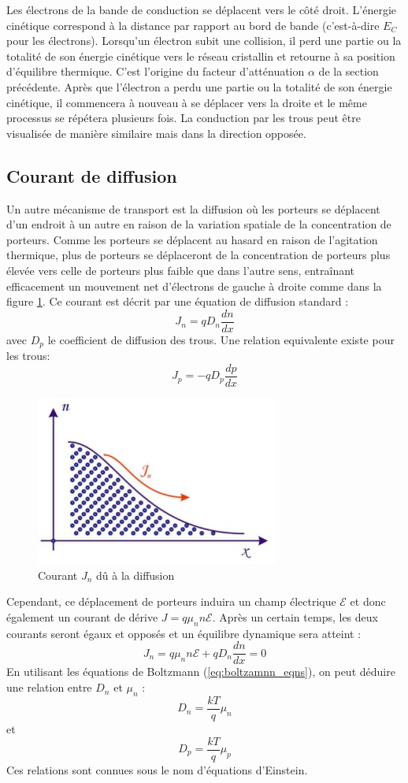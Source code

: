 Les électrons de la bande de conduction se déplacent vers le côté droit. L'énergie cinétique correspond à la distance par rapport au bord de bande (c'est-à-dire $E_C$ pour les électrons). Lorsqu'un électron subit une collision, il perd une partie ou la totalité de son énergie cinétique vers le réseau cristallin et retourne à sa position d'équilibre thermique. C'est l'origine du facteur d'atténuation $\alpha$ de la section précédente. Après que l'électron a perdu une partie ou la totalité de son énergie cinétique, il commencera à nouveau à se déplacer vers la droite et le même processus se répétera plusieurs fois. La conduction par les trous peut être visualisée de manière similaire mais dans la direction opposée.

\subsection{Courant de diffusion}
Un autre mécanisme de transport est la diffusion où les porteurs se déplacent d'un endroit à un autre en raison de la variation spatiale de la concentration de porteurs. Comme les porteurs se déplacent au hasard en raison de l'agitation thermique, plus de porteurs se déplaceront de la concentration de porteurs plus élevée vers celle de porteurs plus faible que dans l'autre sens, entraînant efficacement un mouvement net d'électrons de gauche à droite comme dans la figure \ref{fig:diffusion}. Ce courant est décrit par une équation de diffusion standard :
$$
J_n = q D_n \frac{dn}{dx}
$$
avec $D_p$ le coefficient de diffusion des trous. Une relation equivalente existe pour les trous:
$$
J_p = -q D_p \frac{dp}{dx}
$$
\begin{figure}[h!]
\centering
\includegraphics[width=8cm]{figures/ch01/diffusion.jpg}
\caption{Courant $J_n$ dû à la diffusion} 
\label{fig:diffusion}
\end{figure}
Cependant, ce déplacement de porteurs induira un champ électrique $\mathcal{E}$ et donc également un courant de dérive $J = q \mu_n n \mathcal{E}$. Après un certain temps, les deux courants seront égaux et opposés et un équilibre dynamique sera atteint :
$$
J_n = q \mu_n n \mathcal{E} +  q D_n \frac{dn}{dx} = 0
$$
En utilisant les équations de Boltzmann (\ref{eq:boltzamnn_eqns}), on peut déduire une relation entre $D_n$ et $\mu_n$ :
$$
D_n = \frac{kT}{q} \mu_n
$$
et
$$
D_p = \frac{kT}{q} \mu_p
$$
Ces relations sont connues sous le nom d'équations d'Einstein.
